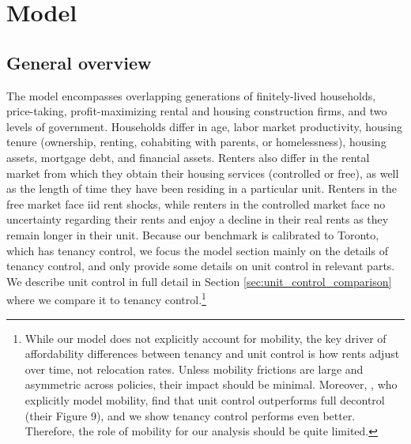 \documentclass[parskip=full]{article}
\begin{document}
\section{Model}\label{sec:model}

\subsection{General overview}\label{sec:brief_overview}

The model encompasses overlapping generations of finitely-lived households, price-taking, profit-maximizing rental and housing construction firms, and two levels of government. Households differ in age, labor market productivity, housing tenure (ownership, renting, cohabiting with parents, or homelessness), housing assets, mortgage debt, and financial assets. Renters also differ in the rental market from which they obtain their housing services (controlled or free), as well as the length of time they have been residing in a particular unit. Renters in the free market face iid rent shocks, while renters in the controlled market face no uncertainty regarding their rents and enjoy a decline in their real rents as they remain longer in their unit. Because our benchmark is calibrated to Toronto, which has tenancy control, we focus the model section mainly on the details of tenancy control, and only provide some details on unit control in relevant parts. We describe unit control in full detail in Section \ref{sec:unit_control_comparison} where we compare it to tenancy control.\footnote{While our model does not explicitly account for mobility, the key driver of affordability differences between tenancy and unit control is how rents adjust over time, not relocation rates. Unless mobility frictions are large and asymmetric across policies, their impact should be minimal. Moreover, \citet{fmn-2023}, who explicitly model mobility, find that unit control outperforms full decontrol (their Figure 9), and we show tenancy control performs even better. Therefore, the role of mobility for our analysis should be quite limited.}
\end{document}
